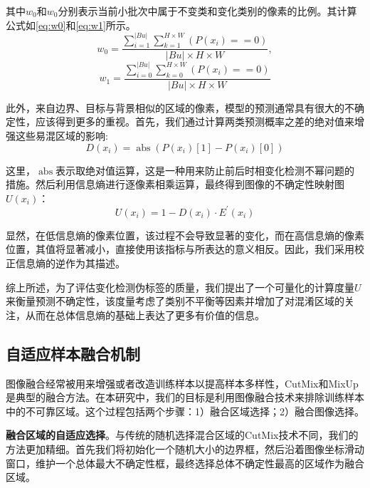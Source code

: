 \documentclass[lang=chs, degree=master, blindreview=false, adobe=false]{yanputhesis}
\begin{document}
其中$w_{0}$和$w_{0}$分别表示当前小批次中属于不变类和变化类别的像素的比例。其计算公式如\autoref{eq:w0}和\autoref{eq:w1}所示。
\begin{equation}
  \label{eq:w0}
  w_{0}=\frac{\sum_{i=1}^{|B u|} \sum_{k=1}^{H \times W}\left(P\left(x_{i}\right)==0\right)}{|B u| \times H \times W},
\end{equation}
\begin{equation}
  \label{eq:w1}
  w_{1}=\frac{\sum_{i=0}^{|B u|} \sum_{k=0}^{H \times W}\left(P\left(x_{i}\right)==0\right)}{|B u| \times H \times W}
\end{equation}

此外，来自边界、目标与背景相似的区域的像素，模型的预测通常具有很大的不确定性，应该得到更多的重视。首先，我们通过计算两类预测概率之差的绝对值来增强这些易混区域的影响:
\begin{equation}
  \label{eq:abs}
  D\left(x_{i}\right)=\operatorname{abs}\left(P\left(x_{i}\right)[1]-P\left(x_{i}\right)[0]\right)
\end{equation}

这里，$\operatorname{abs}$表示取绝对值运算，这是一种用来防止前后时相变化检测不幂问题的措施。然后利用信息熵进行逐像素相乘运算，最终得到图像的不确定性映射图$U\left(x_{i}\right)$：
\begin{equation}
  \label{eq:uncertainty}
  U\left(x_{i}\right)=1-D\left(x_{i}\right) \cdot E^{\prime}\left(x_{i}\right)
\end{equation}

显然，在低信息熵的像素位置，该过程不会导致显著的变化，而在高信息熵的像素位置，其值将显著减小，直接使用该指标与所表达的意义相反。因此，我们采用校正信息熵的逆作为其描述。

综上所述，为了评估变化检测伪标签的质量，我们提出了一个可量化的计算度量$U$来衡量预测不确定性，该度量考虑了类别不平衡等因素并增加了对混淆区域的关注，从而在总体信息熵的基础上表达了更多有价值的信息。
\subsection{自适应样本融合机制}
图像融合经常被用来增强或者改造训练样本以提高样本多样性，CutMix\cite{yun2019cutmix}和MixUp\cite{zhang2017mixup}是典型的融合方法。在本研究中，我们的目标是利用图像融合技术来排除训练样本中的不可靠区域。这个过程包括两个步骤：1）融合区域选择；2）融合图像选择。

\textbf{融合区域的自适应选择}。与传统的随机选择混合区域的CutMix技术不同，我们的方法更加精细。首先我们将初始化一个随机大小的边界框，然后沿着图像坐标滑动窗口，维护一个总体最大不确定性框，最终选择总体不确定性最高的区域作为融合区域。
\end{document}
